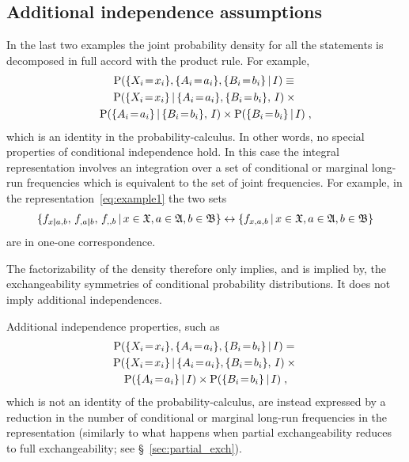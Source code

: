 \documentclass[\ifafour a4paper,12pt,\else a5paper,10pt,\fi%
onecolumn,oneside,article,%
british%
]{memoir}
\theoremstyle{remark}
\theoremstyle{innote}
\DeclarePairedDelimiter\set{\{}{\}}
\newcommand*{\p}{\mathrm{P}}%
\renewcommand*{\|}[1][]{\nonscript\,#1\vert\nonscript\,\mathopen{}}
\newcommand*{\sect}{\S}%
\renewcommand*{\=}{\TextOrMath\texteq\eq}
\newcommand*{\X}[1]{X_{#1}}
\newcommand*{\x}[1]{x_{#1}}
\newcommand*{\A}[1]{A_{#1}}
\newcommand*{\va}[1]{a_{#1}}
\newcommand*{\B}[1]{B_{#1}}
\newcommand*{\vb}[1]{b_{#1}}
\newcommand*{\sX}{\mathfrak{X}}
\newcommand*{\sA}{\mathfrak{A}}
\newcommand*{\sB}{\mathfrak{B}}
\newcommand*{\ff}[1]{f_{#1}}
\newcommand*{\bcond}[1][]{\nonscript\,#1\bm{\vert}\nonscript\;\mathopen{}}
\begin{document}
\subsection{Additional independence assumptions}
\label{sec:graph_repr_indep}

In the last two examples the joint probability density for all the
statements is decomposed in full accord with the product rule. For example,
\begin{multline}
  \label{eq:example_usual_factorization}
  \p( \set{\X{i}\=\x{i}}, \set{\A{i}\=\va{i}}, \set{\B{i}\=\vb{i}} \| I)
  \equiv{}\\
  \p( \set{\X{i}\=\x{i}} \| \set{\A{i}\=\va{i}}, \set{\B{i}\=\vb{i}},\, I)
  \times{}\\
  \p(\set{\A{i}\=\va{i}} \| \set{\B{i}\=\vb{i}},\, I)
\times \p(  \set{\B{i}\=\vb{i}}\| I) \;,
\end{multline}
which is an identity in the probability-calculus. In other words, no
special properties of conditional independence hold. In this case the
integral representation involves an integration over a set of conditional
or marginal long-run frequencies which is equivalent to the set of joint
frequencies. For example, in the representation~\eqref{eq:example1} the
two sets
\begin{equation}
  \label{eq:sets_corr}
  \set{\ff{x \bcond a,b},\, \ff{,a \bcond b},\, \ff{,,b} \|
 x \in \sX, a \in \sA, b \in \sB}
\leftrightarrow
\set{\ff{x,a,b} \| x \in \sX, a \in \sA, b \in \sB}
\end{equation}
are in one-one correspondence.

The factorizability of the density therefore only implies, and is implied
by, the exchangeability symmetries of conditional probability
distributions. It does not imply additional independences.

Additional independence properties, such as
\begin{multline}
  \label{eq:example_independence}
  \p( \set{\X{i}\=\x{i}}, \set{\A{i}\=\va{i}}, \set{\B{i}\=\vb{i}} \| I)
={}\\
  \p( \set{\X{i}\=\x{i}} \| \set{\A{i}\=\va{i}}, \set{\B{i}\=\vb{i}},\, I)
  \times{}\\
  \p(\set{\A{i}\=\va{i}} \|  I)
  \times \p(  \set{\B{i}\=\vb{i}}\| I) \;,
\end{multline}
which is not an identity of the probability-calculus, are instead expressed
by a reduction in the number of conditional or marginal long-run
frequencies in the representation (similarly to what happens when partial
exchangeability reduces to full exchangeability; see
\sect~\ref{sec:partial_exch}).
\end{document}
